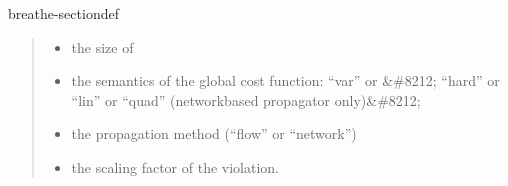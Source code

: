 \documentclass[letterpaper,10pt,openany,oneside,english]{sphinxmanual}
\begin{document}
\begin{fulllineitems}
\begin{sphinxuseclass}{breathe-sectiondef}
\begin{fulllineitems}
\begin{quote}
\begin{description}
\begin{itemize}
\item {} 
\sphinxAtStartPar
{} \textendash{} the size of  

\item {} 
\sphinxAtStartPar
{} \textendash{} the semantics of the global cost function: “var” or \&\#8212; “hard” or “lin” or “quad” (network\sphinxhyphen{}based propagator only)\&\#8212; 

\item {} 
\sphinxAtStartPar
{} \textendash{} the propagation method (“flow” or “network”) 

\item {} 
\sphinxAtStartPar
{} \textendash{} the scaling factor of the violation. 

\end{itemize}

\end{description}\end{quote}

\end{fulllineitems}


\begin{fulllineitems}
\label{\detokenize{ref/ref_cpp:_CPPv4N11WeightedCSP9postWSameEPii6string4Cost}}\label{\detokenize{ref/ref_cpp:_CPPv3N11WeightedCSP9postWSameEPii6string4Cost}}\label{\detokenize{ref/ref_cpp:_CPPv2N11WeightedCSP9postWSameEPii6string4Cost}}\label{\detokenize{ref/ref_cpp:WeightedCSP::postWSame__iP.i.string.Cost}}
\pysigstartsignatures
\pysigstartmultiline
{}
\pysigstopmultiline
\pysigstopsignatures
\end{fulllineitems}


\end{sphinxuseclass}
\end{fulllineitems}
\end{document}
